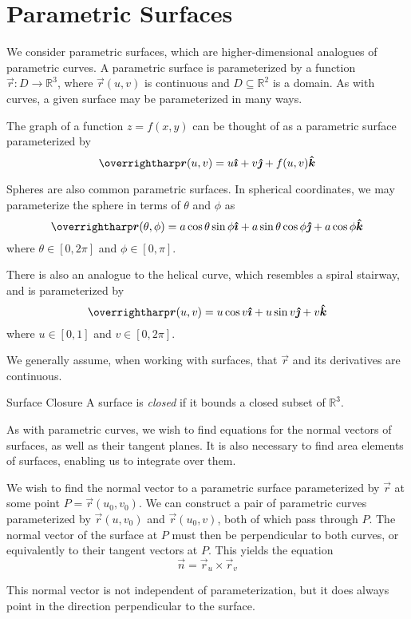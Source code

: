 \documentclass[../main.tex]{subfiles}
\begin{document}
    \section{Parametric Surfaces}
    We consider parametric surfaces, which are higher-dimensional analogues of parametric curves. A parametric surface is parameterized by a function \(\vec{r}:D\to\mathbb{R}^3\), where \(\vec{r}(u,v)\) is continuous and \(D\subseteq\mathbb{R}^2\) is a domain. As with curves, a given surface may be parameterized in many ways.

    The graph of a function \(z=f(x,y)\) can be thought of as a parametric surface parameterized by 
    \[
    \vec{r}(u,v)=u\i+v\j+f(u,v)\k
    \]

    Spheres are also common parametric surfaces. In spherical coordinates, we may parameterize the sphere in terms of \(\theta\) and \(\phi\) as
    \[
    \vec{r}(\theta,\phi)=a\cos{\theta}\sin{\phi}\i+a\sin{\theta}\cos{\phi}\j+a\cos{\phi}\k
    \]
    where \(\theta\in[0,2\pi]\) and \(\phi\in[0,\pi]\).

    There is also an analogue to the helical curve, which resembles a spiral stairway, and is parameterized by
    \[
    \vec{r}(u,v)=u\cos{v}\i+u\sin{v}\j+v\k
    \]
    where \(u\in[0,1]\) and \(v\in[0,2\pi]\).

    We generally assume, when working with surfaces, that \(\vec{r}\) and its derivatives are continuous.
    
    \begin{definition}{Surface Closure}{}
        A surface is \emph{closed} if it bounds a closed subset of \(\mathbb{R}^3\).
    \end{definition}

    As with parametric curves, we wish to find equations for the normal vectors of surfaces, as well as their tangent planes. It is also necessary to find area elements of surfaces, enabling us to integrate over them.

    We wish to find the normal vector to a parametric surface parameterized by \(\vec{r}\) at some point \(P=\vec{r}(u_0,v_0)\). We can construct a pair of parametric curves parameterized by \(\vec{r}(u,v_0)\) and \(\vec{r}(u_0,v)\), both of which pass through \(P\). The normal vector of the surface at \(P\) must then be perpendicular to both curves, or equivalently to their tangent vectors at \(P\). This yields the equation
    \[
    \vec{n}=\vec{r}_u\times\vec{r}_v
    \]

    This normal vector is not independent of parameterization, but it does always point in the direction perpendicular to the surface.
\end{document}
